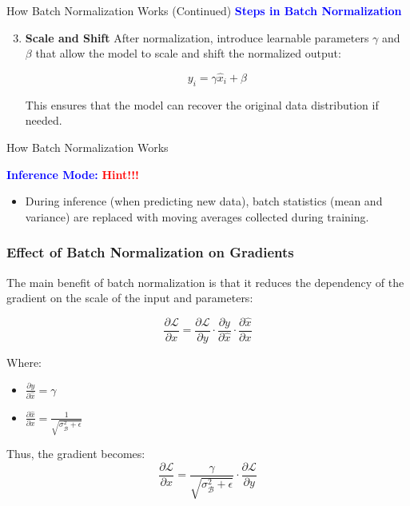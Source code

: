 \documentclass[serif, aspectratio=169]{beamer}
\begin{document}
\begin{frame}{How Batch Normalization Works (Continued)}
    \textcolor{blue}{\textbf{Steps in Batch Normalization}}
    
    \begin{enumerate}[<+-| alert@+>] %
        \setcounter{enumi}{2} %
        \item \textbf{Scale and Shift}
        \newline
        After normalization, introduce learnable parameters $\gamma$ and $\beta$ that allow the model to scale and shift the normalized output:
    
        \[
            y_i = \gamma \hat{x}_i + \beta
        \]

        This ensures that the model can recover the original data distribution if needed.
    \end{enumerate}
\end{frame}

\begin{frame}{How Batch Normalization Works}

    \textcolor{blue}{\textbf{Inference Mode:}} {\textbf{\textcolor{red}{Hint!!!}}}
    
    \begin{itemize}

        \item During inference (when predicting new data), batch statistics (mean and variance) are replaced with moving averages collected during training.

    \end{itemize}
\end{frame}

\begin{frame}
    \frametitle{Effect of Batch Normalization on Gradients}

    The main benefit of batch normalization is that it reduces the dependency of the gradient on the scale of the input and parameters:

    \begin{equation}
        \frac{\partial \mathcal{L}}{\partial x} = \frac{\partial \mathcal{L}}{\partial y} \cdot \frac{\partial y}{\partial \hat{x}} \cdot \frac{\partial \hat{x}}{\partial x}
    \end{equation}

    Where:
    \begin{itemize}
        \item \centering \(\frac{\partial y}{\partial \hat{x}} = \gamma\) \\
        \item \(\frac{\partial \hat{x}}{\partial x} = \frac{1}{\sqrt{\sigma_{\mathcal{B}}^2 + \epsilon}}\)
    \end{itemize}

    Thus, the gradient becomes:
    \begin{equation}
        \frac{\partial \mathcal{L}}{\partial x} = \frac{\gamma}{\sqrt{\sigma_{\mathcal{B}}^2 + \epsilon}} \cdot \frac{\partial \mathcal{L}}{\partial y}
    \end{equation}
\end{frame}
\end{document}
